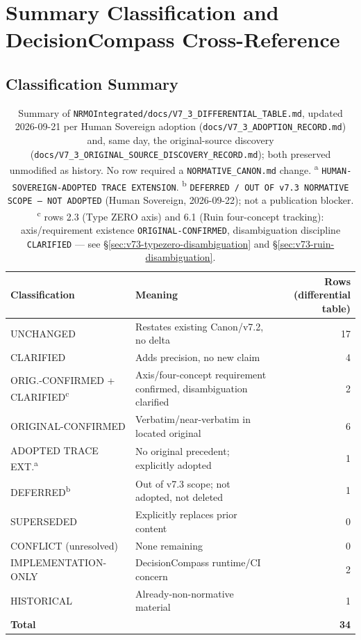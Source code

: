 \chapter{Summary Classification and DecisionCompass Cross-Reference}
\label{ch:v73-summary}

\section{Classification Summary}

\begin{table}[ht]
\centering
\small
\begin{tabularx}{\linewidth}{lXr}
\toprule
\textbf{Classification} & \textbf{Meaning} & \textbf{Rows (differential table)} \\
\midrule
UNCHANGED & Restates existing Canon/v7.2, no delta & 17 \\
CLARIFIED & Adds precision, no new claim & 4 \\
ORIG.-CONFIRMED + CLARIFIED\textsuperscript{c} & Axis/four-concept requirement confirmed, disambiguation clarified & 2 \\
ORIGINAL-CONFIRMED & Verbatim/near-verbatim in located original & 6 \\
ADOPTED TRACE EXT.\textsuperscript{a} & No original precedent; explicitly adopted & 1 \\
DEFERRED\textsuperscript{b} & Out of v7.3 scope; not adopted, not deleted & 1 \\
SUPERSEDED & Explicitly replaces prior content & 0 \\
CONFLICT (unresolved) & None remaining & 0 \\
IMPLEMENTATION-ONLY & DecisionCompass runtime/CI concern & 2 \\
HISTORICAL & Already-non-normative material & 1 \\
\midrule
\textbf{Total} & & \textbf{34} \\
\bottomrule
\end{tabularx}
\caption[v7.3 differential classification summary]{Summary of
\texttt{NRMOIntegrated/docs/V7\_3\_DIFFERENTIAL\_TABLE.md}, updated
2026-09-21 per Human Sovereign adoption
(\texttt{docs/V7\_3\_ADOPTION\_RECORD.md}) and, same day, the
original-source discovery
(\texttt{docs/V7\_3\_ORIGINAL\_SOURCE\_DISCOVERY\_RECORD.md}); both
preserved unmodified as history. No row required a
\texttt{NORMATIVE\_CANON.md} change. \textsuperscript{a}
\texttt{HUMAN-SOVEREIGN-ADOPTED TRACE EXTENSION}.
\textsuperscript{b} \texttt{DEFERRED / OUT OF v7.3 NORMATIVE SCOPE ---
NOT ADOPTED} (Human Sovereign, 2026-09-22); not a publication blocker.
\textsuperscript{c} rows 2.3 (Type ZERO axis) and 6.1 (Ruin
four-concept tracking): axis/requirement existence
\texttt{ORIGINAL-CONFIRMED}, disambiguation discipline
\texttt{CLARIFIED} --- see \S\ref{sec:v73-typezero-disambiguation} and
\S\ref{sec:v73-ruin-disambiguation}.}
\label{tab:v73-classification-summary}
\end{table}

